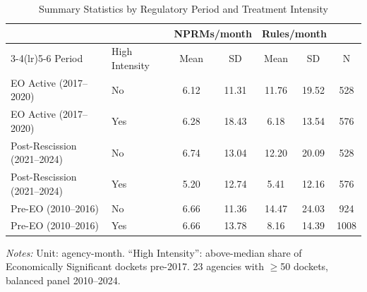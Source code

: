 \begin{table}[t]
\centering
\caption{Summary Statistics by Regulatory Period and Treatment Intensity}
\label{tab:summary}
\begin{threeparttable}
\begin{tabular}{llccccc}
\hline\hline
 & & \multicolumn{2}{c}{NPRMs/month} & \multicolumn{2}{c}{Rules/month} & \\
\cmidrule(lr){3-4}\cmidrule(lr){5-6}
Period & High Intensity & Mean & SD & Mean & SD & N \\
\hline
EO Active (2017--2020) & No & 6.12 & 11.31 & 11.76 & 19.52 & 528 \\
EO Active (2017--2020) & Yes & 6.28 & 18.43 & 6.18 & 13.54 & 576 \\
\addlinespace
Post-Rescission (2021--2024) & No & 6.74 & 13.04 & 12.20 & 20.09 & 528 \\
Post-Rescission (2021--2024) & Yes & 5.20 & 12.74 & 5.41 & 12.16 & 576 \\
\addlinespace
Pre-EO (2010--2016) & No & 6.66 & 11.36 & 14.47 & 24.03 & 924 \\
Pre-EO (2010--2016) & Yes & 6.66 & 13.78 & 8.16 & 14.39 & 1008 \\
\hline\hline
\end{tabular}
\begin{tablenotes}[flushleft]\footnotesize
\item \textit{Notes:} Unit: agency-month. ``High Intensity'': above-median share of Economically Significant dockets pre-2017. 23 agencies with $\geq$50 dockets, balanced panel 2010--2024.
\end{tablenotes}
\end{threeparttable}
\end{table}
